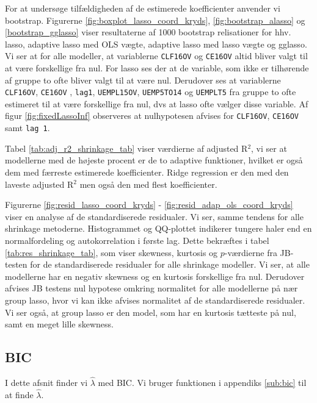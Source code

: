 For at undersøge tilfældigheden af de estimerede koefficienter anvender vi bootstrap. 
Figurerne \ref{fig:boxplot_lasso_coord_kryds}, \ref{fig:bootstrap_alasso} og \ref{bootstrap_gglasso} viser resultaterne af 1000 bootstrap relisationer for hhv. lasso, adaptive lasso med OLS vægte, adaptive lasso med lasso vægte og gglasso. 
Vi ser at for alle modeller, at variablerne \texttt{CLF16OV} og \texttt{CE16OV} altid bliver valgt til at være forskellige fra nul. 
For lasso ses der at de variable, som ikke er tilhørende af gruppe to ofte bliver valgt til at være nul. 
Derudover ses at variablerne  \texttt{CLF16OV},  \texttt{CE16OV} , \texttt{lag1}, \texttt{UEMPL15OV}, \texttt{UEMP5TO14} og \texttt{UEMPLT5} fra gruppe to ofte estimeret til at være forskellige fra nul, dvs at lasso ofte vælger disse variable. 
Af figur \ref{fig:fixedLassoInf} observeres at nulhypotesen afvises for \texttt{CLF16OV}, \texttt{CE16OV} samt \texttt{lag 1}.



Tabel  \ref{tab:adj_r2_shrinkage_tab} viser værdierne af adjusted R$^2$, vi ser at modellerne med de højeste procent er de to adaptive funktioner, hvilket er også dem med færreste estimerede koefficienter. Ridge regression er den med den laveste adjusted R$^2$ men også den med flest koefficienter. 

Figurerne \ref{fig:resid_lasso_coord_kryds} - \ref{fig:resid_adap_ols_coord_kryds} viser en analyse af de standardiserede residualer. 
Vi ser, samme tendens for alle shrinkage metoderne. Histogrammet og QQ-plottet indikerer tungere haler end en normalfordeling og autokorrelation i første lag.
Dette bekræftes i tabel  \ref{tab:res_shrinkage_tab}, som viser skewness, kurtosis og $p$-værdierne fra JB-testen for de standardiserede residualer for alle shrinkage modeller. 
Vi ser, at alle modellerne har en negativ skewness og en kurtosis forskellige fra nul. 
Derudover afvises JB testens nul hypotese omkring normalitet for alle modellerne på nær group lasso, hvor vi kan ikke afvises normalitet af de standardiserede residualer. 
Vi ser også, at group lasso er den model, som har en kurtosis tætteste på nul, samt en meget lille skewness. 






\subsection{BIC}
I dette afsnit finder vi $\widehat{\lambda}$ med BIC. 
Vi bruger funktionen i appendiks \ref{sub:bic} til at finde $\widehat{\lambda}$. 


